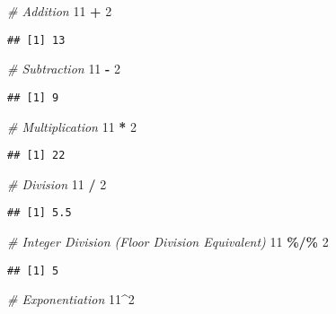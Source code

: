 \documentclass[
]{book}
\newenvironment{Shaded}{\begin{snugshade}}{\end{snugshade}}
\newcommand{\CommentTok}[1]{\textcolor[rgb]{0.56,0.35,0.01}{\textit{#1}}}
\newcommand{\DecValTok}[1]{\textcolor[rgb]{0.00,0.00,0.81}{#1}}
\newcommand{\SpecialCharTok}[1]{\textcolor[rgb]{0.81,0.36,0.00}{\textbf{#1}}}
\theoremstyle{definition}
\theoremstyle{definition}
\theoremstyle{definition}
\theoremstyle{definition}
\theoremstyle{remark}
\begin{document}
\begin{Shaded}
\begin{Highlighting}[]
\CommentTok{\# Addition}
\DecValTok{11} \SpecialCharTok{+} \DecValTok{2}
\end{Highlighting}
\end{Shaded}

\begin{verbatim}
## [1] 13
\end{verbatim}

\begin{Shaded}
\begin{Highlighting}[]
\CommentTok{\# Subtraction}
\DecValTok{11} \SpecialCharTok{{-}} \DecValTok{2}  
\end{Highlighting}
\end{Shaded}

\begin{verbatim}
## [1] 9
\end{verbatim}

\begin{Shaded}
\begin{Highlighting}[]
\CommentTok{\# Multiplication}
\DecValTok{11} \SpecialCharTok{*} \DecValTok{2}
\end{Highlighting}
\end{Shaded}

\begin{verbatim}
## [1] 22
\end{verbatim}

\begin{Shaded}
\begin{Highlighting}[]
\CommentTok{\# Division}
\DecValTok{11} \SpecialCharTok{/} \DecValTok{2}
\end{Highlighting}
\end{Shaded}

\begin{verbatim}
## [1] 5.5
\end{verbatim}

\begin{Shaded}
\begin{Highlighting}[]
\CommentTok{\# Integer Division (Floor Division Equivalent)}
\DecValTok{11} \SpecialCharTok{\%/\%} \DecValTok{2}
\end{Highlighting}
\end{Shaded}

\begin{verbatim}
## [1] 5
\end{verbatim}

\begin{Shaded}
\begin{Highlighting}[]
\CommentTok{\# Exponentiation}
\DecValTok{11}\SpecialCharTok{\^{}}\DecValTok{2}
\end{Highlighting}
\end{Shaded}
\end{document}
